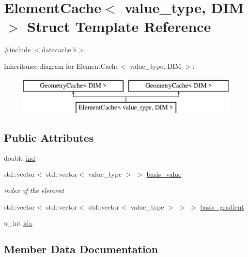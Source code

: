 \hypertarget{struct_element_cache}{}\section{Element\+Cache$<$ value\+\_\+type, D\+IM $>$ Struct Template Reference}
\label{struct_element_cache}


{\ttfamily \#include $<$datacache.\+h$>$}

Inheritance diagram for Element\+Cache$<$ value\+\_\+type, D\+IM $>$\+:\begin{figure}[H]
\begin{center}
\leavevmode
\includegraphics[height=2.000000cm]{struct_element_cache}
\end{center}
\end{figure}
\subsection*{Public Attributes}
\begin{DoxyCompactItemize}
\item 
double \mbox{\hyperlink{struct_element_cache_a285c8c9426673f094eda9254a54d358a}{ind}}
\item 
std\+::vector$<$ std\+::vector$<$ value\+\_\+type $>$ $>$ \mbox{\hyperlink{struct_element_cache_a31bc1cb436c3deb1c9aa8dad78c51a31}{basis\+\_\+value}}
\begin{DoxyCompactList}\small\item\em index of the element \end{DoxyCompactList}\item 
std\+::vector$<$ std\+::vector$<$ std\+::vector$<$ value\+\_\+type $>$ $>$ $>$ \mbox{\hyperlink{struct_element_cache_aeff46109b387c3bbcc45e2a89f387825}{basis\+\_\+gradient}}
\item 
u\+\_\+int \mbox{\hyperlink{struct_element_cache_a9f765d8abac7e3b3bb20426574404932}{idx}}
\end{DoxyCompactItemize}


\subsection{Member Data Documentation}
\mbox{\label{struct_element_cache_aeff46109b387c3bbcc45e2a89f387825}} 
